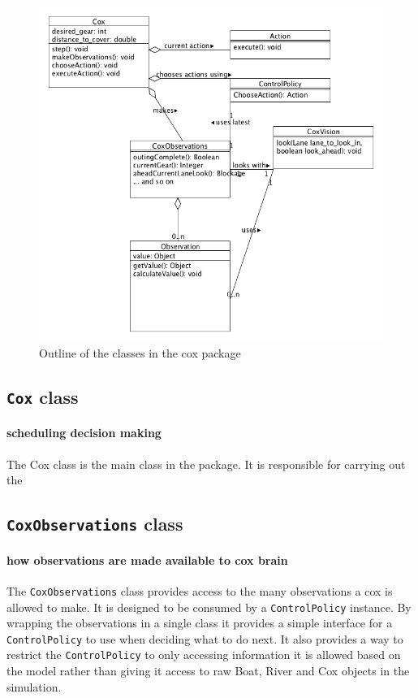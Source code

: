 \begin{figure}
\begin{center}
  \includegraphics[scale=0.3]{images/coxpackageUML.png}
  \caption{Outline of the classes in the cox package}
  \label{software:fig:coxUML}
\end{center}
\end{figure}

\subsection{\texttt{Cox} class}
\paragraph{scheduling decision making}
The Cox class is the main class in the package. It is responsible for carrying out the 

\subsection{\texttt{CoxObservations} class}
\paragraph{how observations are made available to cox brain}
The \texttt{CoxObservations} class provides access to the many observations a cox is allowed to make. It is designed to be consumed by a \texttt{ControlPolicy} instance. By wrapping the observations in a single class it provides a simple interface for a \texttt{ControlPolicy} to use when deciding what to do next. It also provides a way to restrict the \texttt{ControlPolicy} to only accessing information it is allowed based on the model rather than giving it access to raw Boat, River and Cox objects in the simulation.

